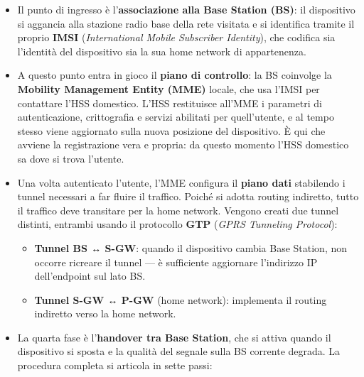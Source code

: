 \documentclass[
  italian,
  openany]{book}
\providecommand{\tightlist}{%
  \setlength{\itemsep}{0pt}\setlength{\parskip}{0pt}}
\begin{document}
\begin{itemize}
\item
  Il punto di ingresso è l'\textbf{associazione alla Base Station (BS)}:
  il dispositivo si aggancia alla stazione radio base della rete
  visitata e si identifica tramite il proprio \textbf{IMSI}
  (\emph{International Mobile Subscriber Identity}), che codifica sia
  l'identità del dispositivo sia la sua home network di appartenenza.
\item
  A questo punto entra in gioco il \textbf{piano di controllo}: la BS
  coinvolge la \textbf{Mobility Management Entity (MME)} locale, che usa
  l'IMSI per contattare l'HSS domestico. L'HSS restituisce all'MME i
  parametri di autenticazione, crittografia e servizi abilitati per
  quell'utente, e al tempo stesso viene aggiornato sulla nuova posizione
  del dispositivo. È qui che avviene la registrazione vera e propria: da
  questo momento l'HSS domestico sa dove si trova l'utente.
\item
  Una volta autenticato l'utente, l'MME configura il \textbf{piano dati}
  stabilendo i tunnel necessari a far fluire il traffico. Poiché si
  adotta routing indiretto, tutto il traffico deve transitare per la
  home network. Vengono creati due tunnel distinti, entrambi usando il
  protocollo \textbf{GTP} (\emph{GPRS Tunneling Protocol}):

  \begin{itemize}
  \tightlist
  \item
    \textbf{Tunnel BS ↔ S-GW}: quando il dispositivo cambia Base
    Station, non occorre ricreare il tunnel --- è sufficiente aggiornare
    l'indirizzo IP dell'endpoint sul lato BS.
  \item
    \textbf{Tunnel S-GW ↔ P-GW} (home network): implementa il routing
    indiretto verso la home network.
  \end{itemize}
\item
  La quarta fase è l'\textbf{handover tra Base Station}, che si attiva
  quando il dispositivo si sposta e la qualità del segnale sulla BS
  corrente degrada. La procedura completa si articola in sette passi:


\end{itemize}
\end{document}
